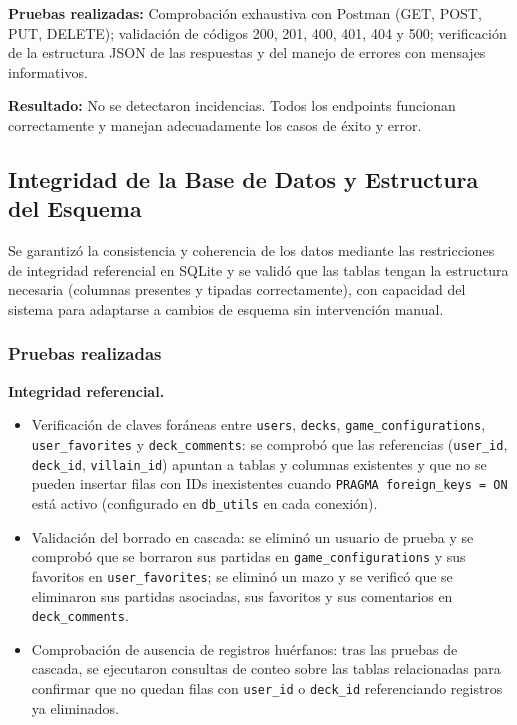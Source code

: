 \textbf{Pruebas realizadas:} Comprobación exhaustiva con Postman (GET, POST, PUT, DELETE); validación de códigos 200, 201, 400, 401, 404 y 500; verificación de la estructura JSON de las respuestas y del manejo de errores con mensajes informativos.

\textbf{Resultado:} No se detectaron incidencias. Todos los endpoints funcionan correctamente y manejan adecuadamente los casos de éxito y error.

\subsection{Integridad de la Base de Datos y Estructura del Esquema}

Se garantizó la consistencia y coherencia de los datos mediante las restricciones de integridad referencial en SQLite y se validó que las tablas tengan la estructura necesaria (columnas presentes y tipadas correctamente), con capacidad del sistema para adaptarse a cambios de esquema sin intervención manual.

\subsubsection*{Pruebas realizadas}

\textbf{Integridad referencial.}
\begin{itemize}
    \item Verificación de claves foráneas entre \texttt{users}, \texttt{decks}, \texttt{game\_configurations}, \texttt{user\_favorites} y \texttt{deck\_comments}: se comprobó que las referencias (\texttt{user\_id}, \texttt{deck\_id}, \texttt{villain\_id}) apuntan a tablas y columnas existentes y que no se pueden insertar filas con IDs inexistentes cuando \texttt{PRAGMA foreign\_keys = ON} está activo (configurado en \texttt{db\_utils} en cada conexión).
    \item Validación del borrado en cascada: se eliminó un usuario de prueba y se comprobó que se borraron sus partidas en \texttt{game\_configurations} y sus favoritos en \texttt{user\_favorites}; se eliminó un mazo y se verificó que se eliminaron sus partidas asociadas, sus favoritos y sus comentarios en \texttt{deck\_comments}.
    \item Comprobación de ausencia de registros huérfanos: tras las pruebas de cascada, se ejecutaron consultas de conteo sobre las tablas relacionadas para confirmar que no quedan filas con \texttt{user\_id} o \texttt{deck\_id} referenciando registros ya eliminados.
\end{itemize}

